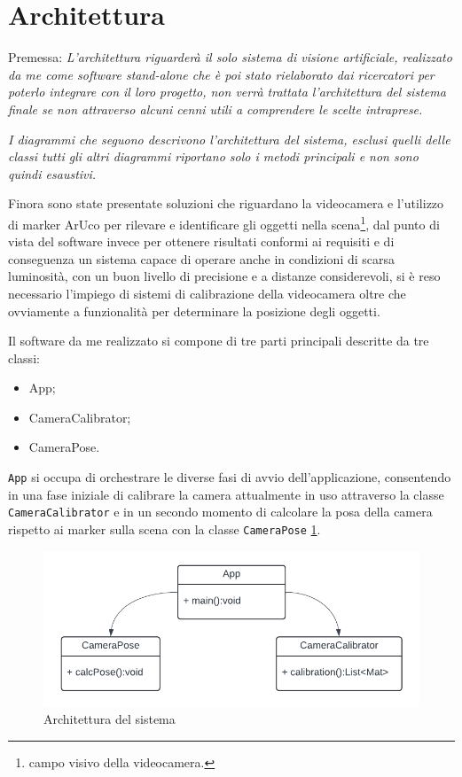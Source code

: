 \documentclass[12pt,a4paper,openright,twoside]{book}
\begin{document}
\section{Architettura}
Premessa: \textit{L'architettura riguarderà il solo sistema di visione artificiale, realizzato da me come software stand-alone che è poi stato rielaborato dai ricercatori per poterlo integrare con il loro progetto, non verrà trattata l'architettura del sistema finale se non attraverso alcuni cenni utili a comprendere le scelte intraprese.}
\vspace{0.5cm}

\textit{I diagrammi che seguono descrivono l'architettura del sistema, esclusi quelli delle classi tutti gli altri diagrammi riportano solo i metodi principali e non sono quindi esaustivi.}
\vspace{0.5cm}

\noindent Finora sono state presentate soluzioni che riguardano la videocamera e l'utilizzo di marker ArUco per rilevare e identificare gli oggetti nella scena\footnote{campo visivo della videocamera.}, dal punto di vista del software invece per ottenere risultati conformi ai requisiti e di conseguenza un sistema capace di operare anche in condizioni di scarsa luminosità, con un buon livello di precisione e a distanze considerevoli, si è reso necessario l'impiego di sistemi di calibrazione della videocamera oltre che ovviamente a funzionalità per determinare la posizione degli oggetti.

Il software da me realizzato si compone di tre parti principali descritte da tre classi:
\begin{itemize}
	\item App;
	\item CameraCalibrator;
	\item CameraPose.
\end{itemize}
\texttt{App} si occupa di orchestrare le diverse fasi di avvio dell'applicazione, consentendo in una fase iniziale di calibrare la camera attualmente in uso attraverso la classe \texttt{CameraCalibrator} e in un secondo momento di calcolare la posa della camera rispetto ai marker sulla scena con la classe \texttt{CameraPose} \ref{fig:architettura}.
\begin{figure}[h!]
	\centering
	\includegraphics[width=0.8\linewidth]{./figures/UML/architecture.pdf}
	\caption{Architettura del sistema}
	\label{fig:architettura}
\end{figure}
\end{document}

